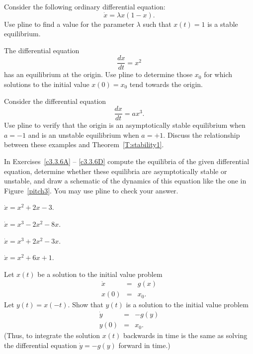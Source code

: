 \begin{exercise} \label{c3.3.3}
Consider the following ordinary differential equation:
\[
\dot{x} = \lambda x(1-x).
\]
Use {\sf pline} to find a value for the parameter $\lambda$ such
that $x(t)=1$ is a stable equilibrium.
\end{exercise}

\begin{exercise} \label{c3.3.4}
The differential equation
\[
\frac{dx}{dt} =  x^2
\]
has an equilibrium at the origin.  Use {\sf pline} to determine
those $x_0$ for which solutions to the initial value $x(0)=x_0$ tend
towards the origin.
\end{exercise}

\begin{exercise} \label{c3.3.5}
Consider the differential equation
\[
\frac{dx}{dt} = a x^3.
\]
Use {\sf pline} to verify that the origin is an asymptotically
stable equilibrium when $a = -1$ and is an unstable
equilibrium when $a = +1$. Discuss the relationship
between these examples and Theorem~\ref{T:stability1}.
\end{exercise}

\TEXER


\noindent In Exercises~\ref{c3.3.6A} -- \ref{c3.3.6D} compute the equilibria 
of the given differential equation, determine whether these equilibria are 
asymptotically stable or unstable, and draw a sche\-ma\-tic of the dynamics 
of this equation like the one in Figure~\ref{pitch3}.  You may use {\sf pline}
to check your answer.
\begin{exercise} \label{c3.3.6A}
$\dot{x} = x^2 + 2x - 3$.
\end{exercise}
\begin{exercise} \label{c3.3.6B}
$\dot{x} = x^3 - 2x^2 - 8x$.
\end{exercise}
\begin{exercise} \label{c3.3.6C}
$\dot{x} = x^3 + 2x^2 - 3x$.
\end{exercise}
\begin{exercise} \label{c3.3.6D}
$\dot{x} = x^2 + 6x + 1$.
\end{exercise}

\begin{exercise} \label{c3.3.7}
Let $x(t)$ be a solution to the initial value problem
\begin{eqnarray*}
\dot{x} & = & g(x) \\
x(0) & = & x_0.
\end{eqnarray*}
Let $y(t)=x(-t)$.  Show that $y(t)$ is a solution to the
initial value problem
\begin{eqnarray*}
\dot{y} & = & -g(y) \\
y(0) & = & x_0.
\end{eqnarray*}
(Thus, to integrate the solution $x(t)$ backwards in time is the
same as solving the differential equation $\dot{y}  =  -g(y)$
forward in time.)
\end{exercise}

